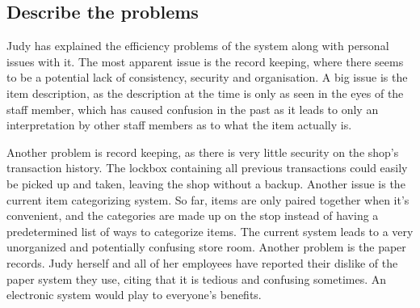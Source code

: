 \subsection{Describe the problems}
Judy has explained the efficiency problems of the system along with personal issues with it. The most apparent issue is the record keeping, where there seems to be a potential lack of consistency, security and organisation. A big issue is the item description, as the description at the time is only as seen in the eyes of the staff member, which has caused confusion in the past as it leads to only an interpretation by other staff members as to what the item actually is. 

Another problem is record keeping, as there is very little security on the shop's transaction history. The lockbox containing all previous transactions could easily be picked up and taken, leaving the shop without a backup. Another issue is the current item categorizing system. So far, items are only paired together when it's convenient, and the categories are made up on the stop instead of having a predetermined list of ways to categorize items. The current system leads to a very unorganized and potentially confusing store room. Another problem is the paper records. Judy herself and all of her employees have reported their dislike of the paper system they use, citing that it is tedious and confusing sometimes. An electronic system would play to everyone's benefits.
